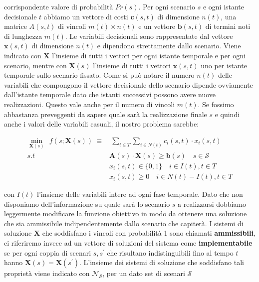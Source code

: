 \documentclass[
]{article}
\begin{document}
corrispondente valore di probabilità {\(Pr(s)\)}. Per ogni scenario
{\(s\)} e ogni istante decisionale {\(t\)} abbiamo un vettore di costi
{\(\mathbf{c}(s,t)\)} di dimensione {\(n(t)\)}, una matrice {\(A(s,t)\)}
di vincoli {\(m(t) \times n(t)\)} e un vettore {\(\mathbf{b}(s,t)\)} di
termini noti di lunghezza {\(m(t)\)}. Le variabili decisionali sono
rappresentate dal vettore {\(\mathbf{x}(s,t)\)} di dimensione {\(n(t)\)}
e dipendono strettamente dallo scenario. Viene indicato con
{\(\mathbf{X}\)} l'insieme di tutti i vettori per ogni istante temporale
e per ogni scenario, mentre con {\(\mathbf{X}(s)\)} l'insieme di tutti i
vettori {\(\mathbf{x}(s,t)\)} uno per istante temporale sullo scenario
fissato. Come si può notare il numero {\(n(t)\)} delle variabili che
compongono il vettore decisionale dello scenario dipende ovviamente
dall'istante temporale dato che istanti successivi possono avere nuove
realizzazioni. Questo vale anche per il numero di vincoli {\(m(t)\)}. Se
fossimo abbastanza preveggenti da sapere quale sarà la realizzazione
finale {\(s\)} e quindi anche i valori delle variabili casuali, il
nostro problema sarebbe:

\begin{equation*}
\begin{split} \min_{\mathbf{X}(s)} \:\:
f(s;\mathbf{X}(s)) \:\equiv & \: \sum_{t\in T} \sum_{i \in N(t)} c_i(s,t) \cdot x_i(s,t)\\
s.t \quad & \mathbf{A}(s)\cdot \mathbf{X}(s)\geq \mathbf{b}(s) \quad s \in \mathcal{S}\\
& x_i(s,t) \in \{0,1\}\quad i \in I(t), t \in T\\
& x_i(s,t) \geq 0 \quad i\in N(t)-I(t), t \in T
\end{split}
\end{equation*}

con {\(I(t)\)} l'insieme delle variabili intere ad ogni fase temporale.
Dato che non disponiamo dell'informazione su quale sarà lo scenario
{\(s\)} a realizzarsi dobbiamo leggermente modificare la funzione
obiettivo in modo da ottenere una soluzione che sia ammissibile
indipendentemente dallo scenario che capiterà. I sistemi di soluzione
{\(\mathbf{X}\)} che soddisfano i vincoli con probabilità 1 sono
chiamati \textbf{ammissibili}, ci riferiremo invece ad un vettore di
soluzioni del sistema come \textbf{implementabile} se per ogni coppia di
scenari {\(s,s^{\prime}\)} che risultano indistinguibili fino al tempo
{\(t\)} hanno {\(\mathbf{X}(s) = \mathbf{X}(s^{\prime})\)}. L'insieme
dei sistemi di soluzione che soddisfano tali proprietà viene indicato
con {\(\mathcal{N}_{\mathcal{S}}\)}, per un dato set di scenari
{\(\mathcal{S}\)}
\end{document}
